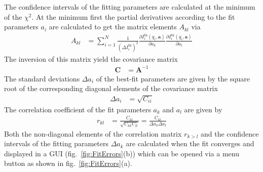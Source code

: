 The confidence intervals of the fitting parameters are calculated at the minimum of the $\chi^2$. At the minimum first the partial derivatives according to the fit parameters $a_i$ are calculated to get the matrix elements $A_{kl}$ via
\begin{align}
A_{kl} &= \sum_{i=1}^{N} \frac{1}{\left(\Delta I_i^\mathrm{th}\right)^2} \frac{\partial I_i^\mathrm{th}(q_i,\mathbf{a})}{\partial a_k} \frac{\partial I_i^\mathrm{th}(q_i,\mathbf{a})}{\partial a_l}
\end{align}
The inversion of this matrix yield the covariance matrix
\begin{align}
        \mathbf{C} &= \mathbf{A}^{-1}
\end{align}
The standard deviations $\Delta a_i$ of the best-fit parameters are given by the square root of the corresponding diagonal elements of the covariance matrix
\begin{align}
\Delta a_i &= \sqrt{C_{ii}}
\end{align}
The correlation coefficient of the fit parameters $a_k$ and $a_l$ are given by
\begin{align}
r_{kl} &= \frac{C_{kl}}{\sqrt{C_{kk}C_{ll}}} = \frac{C_{kl}}{\Delta a_k \Delta a_l}
\end{align}
Both the non-diagonal elements of the correlation matrix $r_{k>l}$ and the confidence intervals of the fitting parameters $\Delta a_k$ are calculated when the fit converges and displayed in a GUI (fig.\ \ref{fig:FitErrors}(b)) which can be opened via a menu button as shown in fig.\ \ref{fig:FitErrors}(a).

